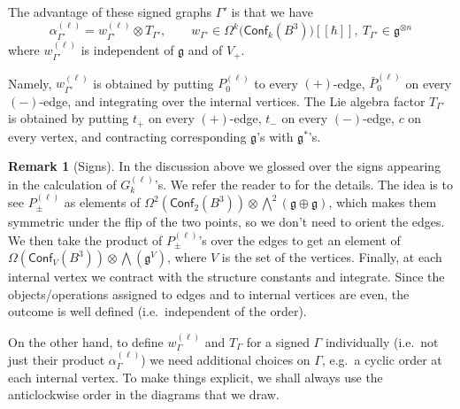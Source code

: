 \documentclass[a4paper]{amsart}
\theoremstyle{plain}
\theoremstyle{definition}
\newtheorem*{rem}{Remark}
\newcommand{\on}{\operatorname}
\newcommand{\g}{\mathfrak{g}}
\newcommand{\bw}{{\textstyle\bigwedge}}
\newcommand{\cf}{\mathsf{Conf}}
\begin{document}
The advantage of these signed graphs $\Gamma'$ is that we have
$$\alpha^{(\ell)}_{\Gamma'} = w^{(\ell)}_{\Gamma'}\otimes T_{\Gamma'},\qquad w_{\Gamma'}\in\Omega^k\bigl(\cf_k(B^3)\bigr)[\![\hbar]\!],\ T_{\Gamma'}\in\g^{\otimes n}$$
where $w^{(\ell)}_{\Gamma'}$ is independent of $\g$ and of $V_+$.

Namely, $w^{(\ell)}_{\Gamma'}$ is obtained by putting $P^{(\ell)}_0$ to every  $(+)$-edge, $\bar P^{(\ell)}_0$ on every  $(-)$-edge, and integrating over the internal vertices. The Lie algebra factor $T_{\Gamma'}$ is obtained by putting $t_+$ on every $(+)$-edge, $t_-$ on every $(-)$-edge, $c$ on every vertex, and contracting corresponding $\g$'s with $\g^*$'s.

\begin{rem}[Signs] 
In the discussion above we glossed over the signs appearing in the calculation of $G_k^{(\ell)}$'s. 
We  refer the reader to \cite{AS} for the details. The idea is to see $P_\pm^{(\ell)}$ as elements of $\Omega^2(\cf_2(B^3))\otimes\bw^2(\g\oplus\g)$, which makes them symmetric under the flip of the two points, so we don't need to orient the edges. We then take the product of $P_\pm^{(\ell)}$'s over the edges to get an element of $\Omega(\cf_V(B^3))\otimes\bw(\g^V)$, where $V$ is the set of the vertices. Finally, at each internal vertex we contract with the structure constants and integrate. Since the objects/operations assigned to edges and to internal vertices are even, the outcome is well defined (i.e.\ independent of the order).

On the other hand, to define $w^{(\ell)}_{\Gamma}$ and $T_{\Gamma}$ for a signed $\Gamma$ individually (i.e.\ not just their product $\alpha^{(\ell)}_{\Gamma}$) we need additional choices on $\Gamma$, e.g.\ a cyclic order at each internal vertex. To make things explicit, we shall always use the anticlockwise order in the diagrams that we draw.
\end{rem}

\end{document}
